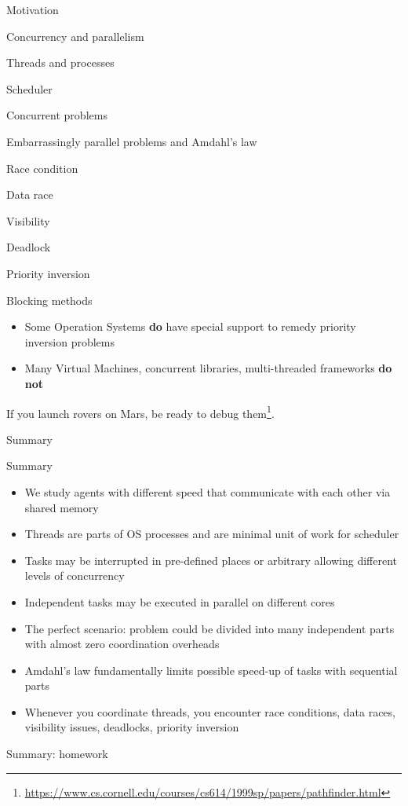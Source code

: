 \begin{section}{Motivation}
\begin{section}{Concurrency and parallelism}
\begin{section}{Threads and processes}
\begin{section}{Scheduler}
\begin{section}{Concurrent problems}
\begin{subsection}{Embarrassingly parallel problems and Amdahl's law}
\begin{subsection}{Race condition}
\begin{subsection}{Data race}
\begin{subsection}{Visibility}
\begin{subsection}{Deadlock}
\begin{subsection}{Priority inversion}
\begin{frame}[fragile]{Blocking methods}
\begin{itemize}
 \item Some Operation Systems \textbf{do} have special support to remedy priority inversion problems
 \item Many Virtual Machines, concurrent libraries, multi-threaded frameworks \textbf{do not}
\end{itemize}

\pause

If you launch rovers on Mars, be ready to debug them\footnote<2->{\url{https://www.cs.cornell.edu/courses/cs614/1999sp/papers/pathfinder.html}}.

\end{frame}


\begin{section}{Summary}

\begin{frame}{Summary}

\begin{itemize}
    \item We study agents with different speed that communicate with each other via shared memory
    \item Threads are parts of OS processes and are minimal unit of work for scheduler
    \item Tasks may be interrupted in pre-defined places or arbitrary allowing different levels of concurrency
    \item Independent tasks may be executed in parallel on different cores
    \item The perfect scenario: problem could be divided into many independent parts with almost zero coordination overheads
    \item Amdahl's law fundamentally limits possible speed-up of tasks with sequential parts
    \item Whenever you coordinate threads, you encounter race conditions, data races, visibility issues, deadlocks, priority inversion
\end{itemize}

\end{frame}

\begin{frame}{Summary: homework}


\end{frame}
\end{section}
\end{subsection}
\end{subsection}
\end{subsection}
\end{subsection}
\end{subsection}
\end{subsection}
\end{section}
\end{section}
\end{section}
\end{section}
\end{section}
